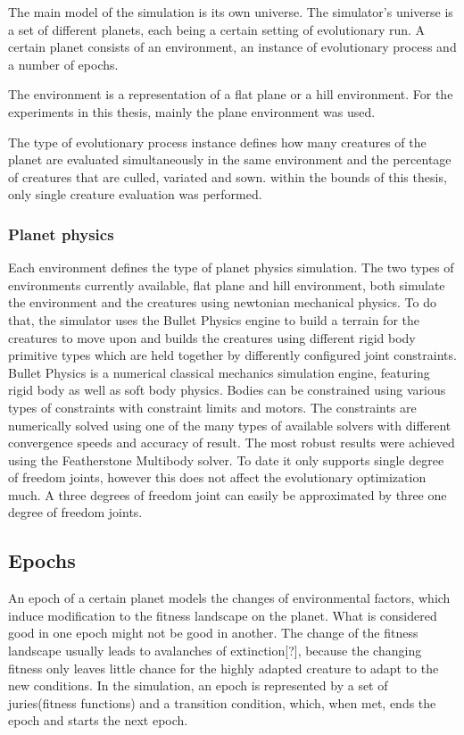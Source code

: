 \documentclass[main]{subfiles}
\begin{document}
The main model of the simulation is its own universe. The simulator's universe is a set of different planets, each being a certain setting of evolutionary run. A certain planet consists of an environment, an instance of evolutionary process and a number of epochs. 

The environment is a representation of a flat plane or a hill environment. For the experiments in this thesis, mainly the plane environment was used.

The type of evolutionary process instance defines how many creatures of the planet are evaluated simultaneously in the same environment and the percentage of creatures that are culled, variated and sown. within the bounds of this thesis, only single creature evaluation was performed. 

\subsubsection{Planet physics}

Each environment defines the type of planet physics simulation. The two types of environments currently available, flat plane and hill environment, both simulate the environment and the creatures using newtonian mechanical physics. To do that, the simulator uses the Bullet Physics engine\cite{bulletphysics} to build a terrain for the creatures to move upon and builds the creatures using different rigid body primitive types which are held together by differently configured joint constraints. Bullet Physics is a numerical classical mechanics simulation engine, featuring rigid body as well as soft body physics. Bodies can be constrained using various types of constraints with constraint limits and motors. The constraints are numerically solved using one of the many types of available solvers with different convergence speeds and accuracy of result. The most robust results were achieved using the Featherstone Multibody solver. To date it only supports single degree of freedom joints, however this does not affect the evolutionary optimization much. A three degrees of freedom joint can easily be approximated by three one degree of freedom joints.

\subsection{Epochs}

An epoch of a certain planet models the changes of environmental factors, which induce modification to the fitness landscape on the planet. What is considered good in one epoch might not be good in another. The change of the fitness landscape usually leads to avalanches of extinction[?], because the changing fitness only leaves little chance for the highly adapted creature to adapt to the new conditions. In the simulation, an epoch  is represented by a set of juries(fitness functions) and a transition condition, which, when met, ends the epoch and starts the next epoch.
\end{document}
